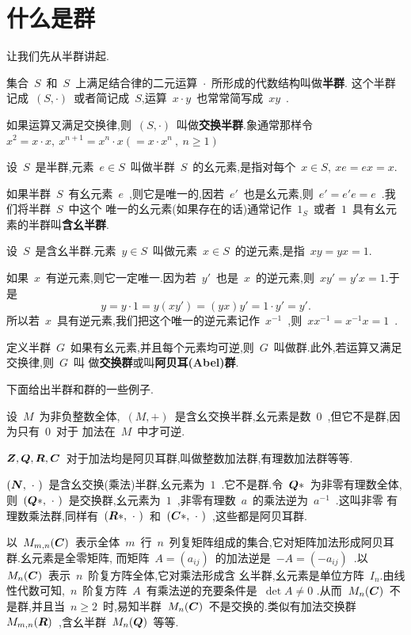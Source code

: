 \section{什么是群}\label{sec:1.2}
让我们先从半群讲起.
\begin{Definition}
    集合~$S$~和~$S$~上满足结合律的二元运算~$\cdot$~所形成的代数结构叫做\textbf{半群}.
    这个半群记成~$(S,\cdot)$~或者简记成~$S$,运算~$x \cdot y$~也常常简写成~$xy$~.
\end{Definition}\par
如果运算又满足交换律,则~$(S,\cdot)$~叫做\textbf{交换半群}.象通常那样令
~$x^2=x \cdot x,~x^{n+1}=x^n \cdot x(=x \cdot x^n~,~n \geq 1)$
\begin{Definition}
    设~$S$~是半群,元素~$e \in S$~叫做半群~$S$~的幺元素,是指对每个~$x \in S,~xe=ex=x.$~
\end{Definition}
如果半群~$S$~有幺元素~$e$~,则它是唯一的,因若~$e'$~也是幺元素,则~$e'=e'e=e$~.我们将半群~$S$~中这个
唯一的幺元素(如果存在的话)通常记作~$1_S$~或者~$1$~具有幺元素的半群叫\textbf{含幺半群}.
\begin{Definition}
    设~$S$~是含幺半群.元素~$y \in S$~叫做元素~$x \in S$~的逆元素,是指~$xy=yx=1$.
\end{Definition}
如果~$x$~有逆元素,则它一定唯一.因为若~$y'$~也是~$x$~的逆元素,则~$xy'=y'x=1$.于是
\begin{equation*}
    y=y \cdot 1=y(xy')=(yx)y'=1 \cdot y'=y'.
\end{equation*}
所以若~$x$~具有逆元素,我们把这个唯一的逆元素记作~$x^{-1}$~,则~$xx^{-1}=x^{-1}x=1$~.
\begin{Definition}
    定义半群~$G$~如果有幺元素,并且每个元素均可逆,则~$G$~叫做群.此外,若运算又满足交换律,则~$G$~叫
    做\textbf{交换群}或叫\textbf{阿贝耳(Abel)群}.
\end{Definition}
下面给出半群和群的一些例子.
\begin{example}
    设~$M$~为非负整数全体,~$(M,+)$~是含幺交换半群,幺元素是数~$0$~,但它不是群,因为只有~$0$~对于
    加法在~$M$~中才可逆.
\end{example}\par
$\boldsymbol{Z},\boldsymbol{Q},\boldsymbol{R},\boldsymbol{C}$~对于加法均是阿贝耳群,叫做整数加法群,有理数加法群等等.\par
$(\boldsymbol{N},~\cdot~)$~是含幺交换(乘法)半群,幺元素为~$1$~.它不是群.令~$\boldsymbol{Q}\ast$~为非零有理数全体,
则~$(\boldsymbol{Q}\ast,~\cdot~)$~是交换群,幺元素为~$1$~,非零有理数~$a$~的乘法逆为~$a^{-1}$~.这叫非零
有理数乘法群,同样有~$(\boldsymbol{R}\ast,~\cdot~)$~和~$(\boldsymbol{C}\ast,~\cdot~)$~,这些都是阿贝耳群.
\begin{example}
    以~$M_{m,n}(\boldsymbol{C})$~表示全体~$m$~行~$n$~列复矩阵组成的集合,它对矩阵加法形成阿贝耳群.幺元素是全零矩阵,
    而矩阵~$A=(a_{ij})$~的加法逆是~$-A=(-a_{ij})$~.以~$M_n(\boldsymbol{C})$~表示~$n$~阶复方阵全体,它对乘法形成含
    幺半群,幺元素是单位方阵~$I_n$.由线性代数可知,~$n$~阶复方阵~$A$~有乘法逆的充要条件是~$\det A \neq 0$
    .从而~$M_n(\boldsymbol{C})$~不是群,并且当~$n \geq 2$~时,易知半群~$M_n(\boldsymbol{C})$~不是交换的.类似有加法交换群
    ~$M_{m,n}(\boldsymbol{R})$~,含幺半群~$M_{n}(\boldsymbol{Q})$~等等.
\end{example}
